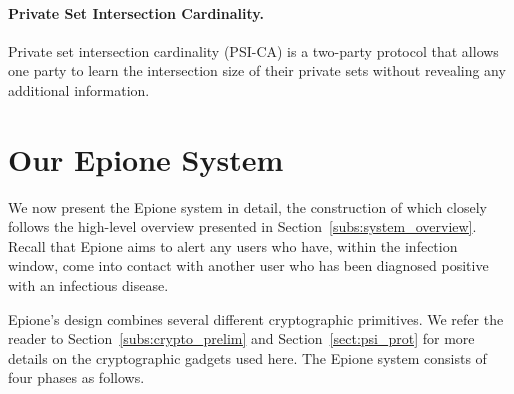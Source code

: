 \documentclass[11pt]{article} %
\newcommand{\sectionref}[1]{Section~\ref{#1}}
\newcommand{\figureref}[1]{Figure~\ref{#1}}
\newcommand{\dect}{\textsf{Epione}\xspace}
\newcommand{\psica}{PSI-CA\xspace}
\newcommand{\remove}[1]{}
\begin{document}
\paragraph{Private Set Intersection Cardinality.}	
Private set intersection cardinality (\psica) is a two-party protocol that allows one party to learn the intersection size of their private sets without revealing any additional information. \remove{The \psica functionality is presented in \figureref{fig:psica-func}.
	
	
	
	\begin{figure}[t!]
		\centering
		\framebox{
			\begin{minipage}{0.95\linewidth}
				{\sc Parameters:}
				Two parties: server and client; and upper bound on the input set size.
				
				
				{\sc Functionality:}
				\begin{itemize}
					\item Wait for input set $X$  from the server
					\item Wait for input set $Y$ from the client
					\item Give server nothing		
					\item Give client $|X \cap Y|$		
				\end{itemize}
			\end{minipage}
		}
		\caption{The \psica Functionality.}
		\label{fig:psica-func}	
	\end{figure}
	
}

\section{Our \dect System}
\label{sect:system}
We now present the \dect system in detail, the construction of which closely
follows the high-level overview presented in \sectionref{subs:system_overview}. Recall that \dect aims to alert any users who have, within the infection window, come into contact with another user who has been diagnosed positive with an infectious disease.



\dect's design combines several different cryptographic primitives. %
We refer the reader to \sectionref{subs:crypto_prelim} and \sectionref{sect:psi_prot} for more details on the cryptographic gadgets used here. The \dect system consists of four phases as follows.
\end{document}
